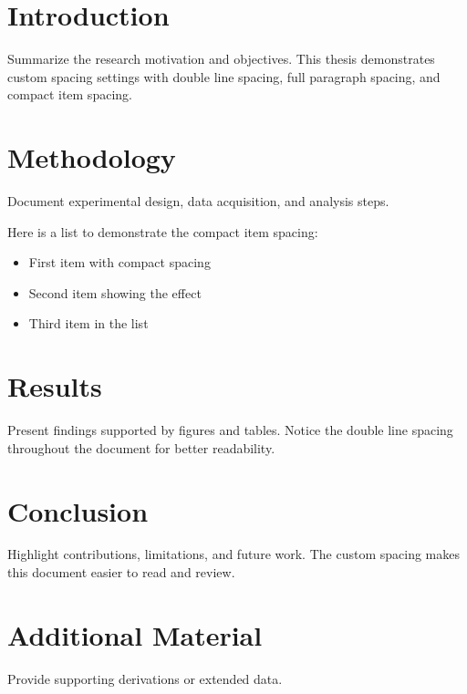 \documentclass[
    language=english,
    doctype=thesis,
    institution=none,
    titlestyle=thesis
]{../../omnilatex}
\begin{document}
\frontmatter
\maketitle
\tableofcontents

\mainmatter
\chapter{Introduction}
Summarize the research motivation and objectives. This thesis demonstrates custom spacing settings with double line spacing, full paragraph spacing, and compact item spacing.

\chapter{Methodology}
Document experimental design, data acquisition, and analysis steps.

Here is a list to demonstrate the compact item spacing:

\begin{itemize}
    \item First item with compact spacing
    \item Second item showing the effect
    \item Third item in the list
\end{itemize}

\chapter{Results}
Present findings supported by figures and tables. Notice the double line spacing throughout the document for better readability.

\chapter{Conclusion}
Highlight contributions, limitations, and future work. The custom spacing makes this document easier to read and review.

\appendix
\chapter{Additional Material}
Provide supporting derivations or extended data.

\backmatter
\printbibliography
\end{document}
